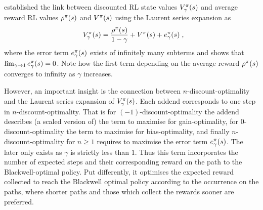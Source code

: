 \documentclass[envcountsame]{llncs}
\begin{document}
\cite{MillerVeinott1969} established the link between discounted RL state values
\(V_{\gamma}^{\pi}(s)\) and average reward RL values \(\rho^{\pi}(s)\) and \(V^{\pi}(s)\)
using the Laurent series expansion as
\begin{align*}
  V_{\gamma}^{\pol}(s) = \frac{\avgrew^{\pol}(s)}{1-\gamma} + V^{\pol}(s) + e_{\gamma}^{\pol}(s) \tcom
\end{align*}
%
where the error term \(e_{\gamma}^{\pi}(s)\) exists of infinitely many subterms and
\citet{Puterman94} shows that \(\lim_{\gamma \to 1} e_{\gamma}^{\pi}(s) = 0\). Note how the first
term depending on the average reward \(\rho^{\pi}(s)\) converges to infinity as \(\gamma\)
increases.


However, an important insight is the connection between \(n\)-discount-optimality and the Laurent
series expansion of \(V_{\gamma}^{\pi}(s)\). Each addend corresponds to one step in
\(n\)-discount-optimality. That is for \((-1)\)-discount-optimality the addend describes (a scaled
version of) the term to maximise for gain-optimality,
%
for \(0\)-discount-optimality the term to maximise for bias-optimality, and
%
finally \(n\)-discount-optimality for \(n \geqslant 1\) requires to maximise the error term
\(e_{\gamma}^{\pi}(s)\). The later only exists as \(\gamma\) is strictly less than \(1\). Thus this
term incorporates the number of expected steps and their corresponding reward on the path to the
Blackwell-optimal policy. Put differently, it optimises the expected reward collected to reach the
Blackwell optimal policy according to the occurrence on the paths, where shorter paths and those
which collect the rewards sooner are preferred.

\end{document}
